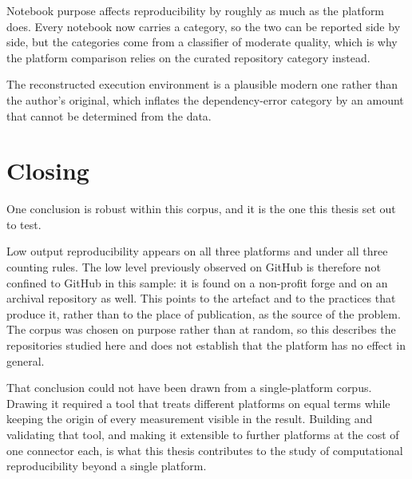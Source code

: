 Notebook purpose affects reproducibility by roughly as much as the platform does. Every notebook now carries a category, so the two can be reported side by side, but the categories come from a classifier of moderate quality, which is why the platform comparison relies on the curated repository category instead.

The reconstructed execution environment is a plausible modern one rather than the author's original, which inflates the dependency-error category by an amount that cannot be determined from the data.

\section{Closing}

One conclusion is robust within this corpus, and it is the one this thesis set out to test.

Low output reproducibility appears on all three platforms and under all three counting rules. The low level previously observed on GitHub is therefore not confined to GitHub in this sample: it is found on a non-profit forge and on an archival repository as well. This points to the artefact and to the practices that produce it, rather than to the place of publication, as the source of the problem. The corpus was chosen on purpose rather than at random, so this describes the repositories studied here and does not establish that the platform has no effect in general.

That conclusion could not have been drawn from a single-platform corpus. Drawing it required a tool that treats different platforms on equal terms while keeping the origin of every measurement visible in the result. Building and validating that tool, and making it extensible to further platforms at the cost of one connector each, is what this thesis contributes to the study of computational reproducibility beyond a single platform.

